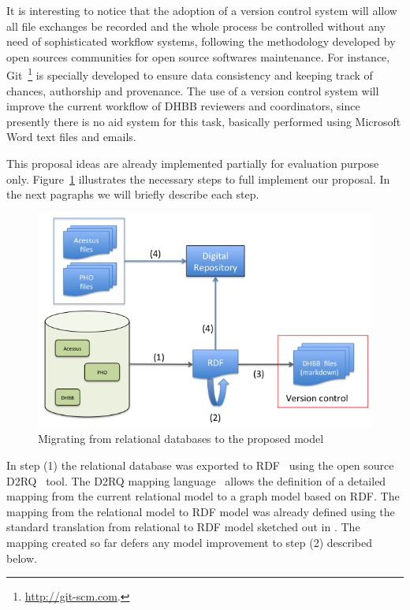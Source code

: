 It is interesting to notice that the adoption of a version control
system will allow all file exchanges be recorded and the whole process
be controlled without any need of sophisticated workflow systems,
following the methodology developed by open sources communities for
open source softwares maintenance. For instance,
Git~\footnote{\url{http://git-scm.com}.} is specially developed to
ensure data consistency and keeping track of chances, authorship and
provenance. The use of a version control system will improve the
current workflow of DHBB reviewers and coordinators, since presently
there is no aid system for this task, basically performed using
Microsoft Word text files and emails.


This proposal ideas are already implemented partially for evaluation
purpose only. Figure~\ref{fig:dia-1} illustrates the necessary steps
to full implement our proposal. In the next pagraphs we will briefly
describe each step.

\begin{figure}[htbp]
  \centering
  \includegraphics[width=.6\textwidth]{migration.png}
  \caption{Migrating from relational databases to the proposed model}\label{fig:dia-1}
\end{figure}

In step (1) the relational database was exported to
RDF~\cite{rdf-primer} using the open source D2RQ~\cite{d2rq} tool. The
D2RQ mapping language~\cite{d2rq-map} allows the definition of a
detailed mapping from the current relational model to a graph model
based on RDF. The mapping from the relational
model to RDF model was already defined using the standard translation from relational
to RDF model sketched out in \cite{dbANDrdf}. The mapping created so
far defers any model improvement to step (2) described below. 

